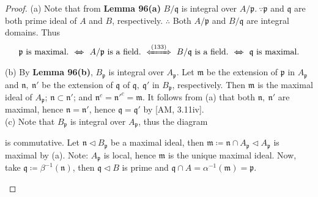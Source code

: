 \documentclass[12pt,a4paper,footinclude=true,headinclude=true]{scrbook} %
\begin{document}
\begin{proof}
    (a) Note that from \textbf{Lemma 96(a)} $B/\mathfrak{q}$ is integral over $A/\mathfrak{p}.\ \because \mathfrak{p}$ and $\mathfrak{q}$ are both prime ideal of $A$ and $B$, respectively. $\therefore$ Both $A/\mathfrak{p}$ and $B/\mathfrak{q}$ are integral domains. Thus
    \begin{align*}
        \mathfrak{p}\ \text{is maximal}.\ \xLeftrightarrow{}\ A/\mathfrak{p}\ \text{is a field}.\ \xLeftrightarrow{\text{(133)}}\ B/\mathfrak{q}\ \text{is a field}.\ \xLeftrightarrow{}\ \mathfrak{q}\ \text{is maximal}.
    \end{align*}
    (b) By \textbf{Lemma 96(b)}, $B_\mathfrak{p}$ is integral over $A_\mathfrak{p}$. Let $\mathfrak{m}$ be the extension of $\mathfrak{p}$ in $A_\mathfrak{p}$ and $\mathfrak{n},\ \mathfrak{n}'$ be the extension of $\mathfrak{q}$ of $\mathfrak{q},\ \mathfrak{q}'$ in $B_\mathfrak{p}$, respectively. Then $\mathfrak{m}$ is the maximal ideal of $A_\mathfrak{p}$; $\mathfrak{n}\subset\mathfrak{n}'$; and $\mathfrak{n}^c=\mathfrak{n}'^c=\mathfrak{m}$. It follows from (a) that both $\mathfrak{n},\ \mathfrak{n}'$ are maximal, hence $\mathfrak{n}=\mathfrak{n}'$, hence $\mathfrak{q}=\mathfrak{q}'$ by [AM, 3.11iv].\\
    (c) Note that $B_\mathfrak{p}$ is integral over $A_\mathfrak{p}$, thus the diagram 
    \begin{center}
    \end{center}
    is commutative. Let $\mathfrak{n}\triangleleft B_\mathfrak{p}$ be a maximal ideal, then $\mathfrak{m}\coloneqq\mathfrak{n}\cap A_\mathfrak{p}\triangleleft A_\mathfrak{p}$ is maximal by (a). Note: $A_\mathfrak{p}$ is local, hence $\mathfrak{m}$ is the unique maximal ideal. Now, take $\mathfrak{q}\coloneqq\beta^{-1}(\mathfrak{n})$, then $\mathfrak{q}\triangleleft B$ is prime and $\mathfrak{q}\cap A=\alpha^{-1}(\mathfrak{m})=\mathfrak{p}$.
    \begin{center}
    \end{center}    
\end{proof}
\end{document}
